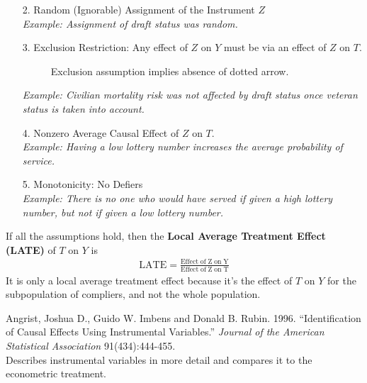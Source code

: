 \documentclass{beamer}
\begin{document}
\begin{frame}
\begin{itemize}
\item [2.] Random (Ignorable) Assignment of the Instrument $Z$ \\
\pause
\tiny
{\it Example: Assignment of draft status was random.}
\normalsize
\bigskip
\pause
\item [3.] Exclusion Restriction: \pause Any effect of $Z$ on $Y$ must
be via an effect of $Z$ on $T$.
\pause
\small
\begin{figure}[!htp]
\caption{Exclusion assumption implies absence of dotted arrow.}
\centerline{
}
\end{figure}
\pause
\tiny
{\it Example: Civilian mortality risk was not affected by draft status once
veteran status is taken into account.}
\normalsize
\bigskip
\item [4.] Nonzero Average Causal Effect of $Z$ on $T$.\\
\pause
\tiny
{\it Example:  Having a low lottery number increases the average probability of service.}
\normalsize
\bigskip
\pause
\item [5.] Monotonicity: \pause No Defiers\\
\pause
\tiny
{\it Example: There is no one who would have served if given a high lottery number, but not if given a low lottery number.}
\normalsize
\end{itemize}
\end{frame}

\begin{frame}
If all the assumptions hold, then the {\bf Local Average Treatment
Effect (LATE)} of $T$ on $Y$ is 
\begin{eqnarray*}
\mathrm{LATE} = \frac{\mathrm{Effect \; of \; Z \; on \;
Y}}{\mathrm{Effect \; of \; Z \; on \; T}} 
\end{eqnarray*}
\pause
It is only a local average treatment effect because it's the effect of
$T$ on $Y$ for the subpopulation of compliers, and not the whole population.
\end{frame}

\begin{frame}
Angrist, Joshua D., Guido W. Imbens and Donald B. Rubin. 1996. ``Identification of Causal Effects
Using Instrumental Variables.'' {\it Journal of the American
Statistical Association} 91(434):444-455. \\
\bigskip
Describes instrumental variables in more detail and compares it to the
econometric treatment.
\end{frame}
\end{document}
